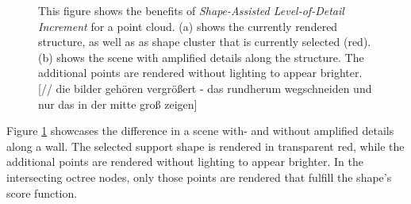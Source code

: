 \begin{figure}
\centering
{}\par\medskip
{}
\caption[Comparison of a scene with and without Shape-Assisted Level-of-Detail Increment.]
{This figure shows the benefits of \textit{Shape-Assisted Level-of-Detail Increment} for a point cloud. (a) shows the currently rendered structure, as well as as shape cluster that is currently selected (red). (b) shows the scene with amplified details along the structure. The additional points are rendered without lighting to appear brighter. [// die bilder gehören vergrößert - das rundherum wegschneiden und nur das in der mitte groß zeigen]}
\label{fig:lod_increment}
\end{figure}

Figure \ref{fig:lod_increment} showcases the difference in a scene with- and without amplified details along a wall. The selected support shape is rendered in transparent red, while the additional points are rendered without lighting to appear brighter. In the intersecting octree nodes, only those points are rendered that fulfill the shape's score function. 


